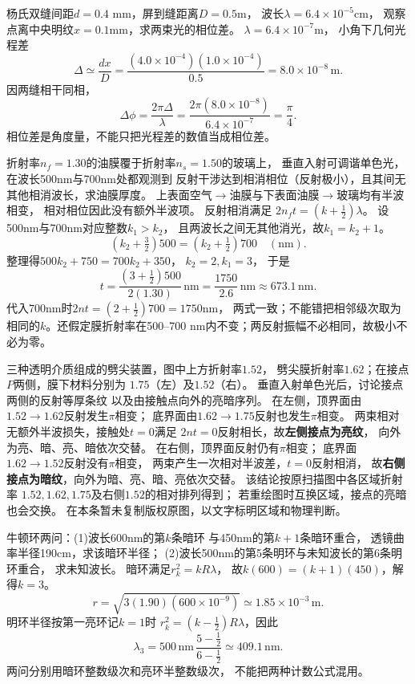 \problemtext 杨氏双缝间距$d=0.4$ mm，屏到缝距离$D=0.5$m，
波长$\lambda=6.4\times10^{-5}$cm，
观察点离中央明纹$x=0.1$mm，求两束光的相位差。
\workings
$\lambda=6.4\times10^{-7}$m，
小角下几何光程差
\[
\Delta \simeq\frac{dx}{D}
=\frac{(4.0\times10^{-4})(1.0\times10^{-4})}{0.5}
=8.0\times10^{-8}\,\mathrm m.
\]
因两缝相干同相，
\[
\boxed{\Delta\phi=\frac{2\pi\Delta}{\lambda}
=\frac{2\pi(8.0\times10^{-8})}{6.4\times10^{-7}}
=\frac{\pi}{4}}.
\]
\crosscheck 相位差是角度量，不能只把光程差的数值当成相位差。

\problemtext 折射率$n_f=1.30$的油膜覆于折射率$n_s=1.50$的玻璃上，
垂直入射可调谐单色光，在波长500nm与700nm处都观测到
反射干涉达到相消相位（反射极小），且其间无其他相消波长，求油膜厚度。
\workings
上表面空气$\to$油膜与下表面油膜$\to$玻璃均有半波相变，
相对相位因此没有额外半波项。
反射相消满足
$2n_ft=(k+\tfrac12)\lambda$。
设500nm与700nm对应整数$k_1>k_2$，
且两波长之间无其他消光，故$k_1=k_2+1$。
\[
( k_2+\tfrac32)500=(k_2+\tfrac12)700\quad(\mathrm{nm}).
\]
整理得$500k_2+750=700k_2+350$，
$k_2=2,k_1=3$，
于是
\[
\boxed{t=\frac{(3+\tfrac12)500}{2(1.30)}\,\mathrm{nm}
=\frac{1750}{2.6}\,\mathrm{nm}
\approx673.1\,\mathrm{nm}}.
\]
\crosscheck 代入700nm时$2nt=(2+\tfrac12)700=1750$nm，
两式一致；不能错把相邻级次取为相同的$k$。还假定膜折射率在500--700 nm内不变；两反射振幅不必相同，故极小不必为零。

\problemtext 三种透明介质组成的劈尖装置，图中上方折射率$1.52$，
劈尖膜折射率$1.62$；在接点$P$两侧，膜下材料分别为
$1.75$（左）及$1.52$（右）。
垂直入射单色光后，讨论接点两侧的反射等厚条纹
以及由接触点向外的亮暗序列。
\workings
在左侧，顶界面由$1.52\to1.62$反射发生$\pi$相变；
底界面由$1.62\to1.75$反射也发生$\pi$相变。
两束相对无额外半波损失，接触处$t=0$满足
$2nt=0$反射相长，故\textbf{左侧接点为亮纹}，
向外为亮、暗、亮、暗依次交替。
在右侧，顶界面反射仍有$\pi$相变；
底界面$1.62\to1.52$反射没有$\pi$相变，
两束产生一次相对半波差，$t=0$反射相消，
故\textbf{右侧接点为暗纹}，向外为暗、亮、暗、亮依次交替。
\crosscheck 该结论按原扫描图中各区域折射率
$1.52,1.62,1.75$及右侧$1.52$的相对排列得到；
若重绘图时互换区域，接点的亮暗也会交换。
在本条暂未复制版权原图，以文字标明区域和物理判断。

\problemtext 牛顿环两问：(1)波长600nm的第$k$条暗环
与450nm的第$k+1$条暗环重合，
透镜曲率半径190cm，求该暗环半径；
(2)波长500nm的第5条明环与未知波长的第6条明环重合，
求未知波长。
\workings
暗环满足$r_k^2=kR\lambda$，
故$k(600)=(k+1)(450)$，解得$k=3$。
\[
\boxed{r=\sqrt{3(1.90)(600\times10^{-9})}
\simeq1.85\times10^{-3}\,\mathrm m}.
\]
明环半径按第一亮环记$k=1$时
$r_k^2=(k-\tfrac12)R\lambda$，因此
\[
\boxed{\lambda_3
=500\,\mathrm{nm}\,\frac{5-\tfrac12}{6-\tfrac12}
\simeq409.1\,\mathrm{nm}}.
\]
\crosscheck 两问分别用暗环整数级次和亮环半整数级次，
不能把两种计数公式混用。

